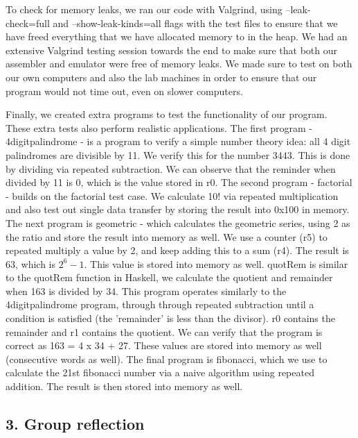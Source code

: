 \documentclass[a4paper]{article}
\begin{document}
To check for memory leaks, we ran our code with Valgrind, using --leak-check=full and --show-leak-kinds=all flags 
with the test files to ensure that we have freed everything that we have allocated memory to in the heap. We had an extensive Valgrind
testing session towards the end to make sure that both our assembler and emulator were free of memory leaks. We made sure to test on 
both our own computers and also the lab machines in order to ensure that our program would not time out, even on slower computers. 

Finally, we created extra programs to test the functionality of our program. These extra tests also perform realistic applications. The
first program - 4digitpalindrome - is a program to verify a simple number theory idea: all 4 digit palindromes are divisible by 11. We 
verify this for the number 3443. This is done by dividing via repeated subtraction. We can observe that the reminder when divided by 11 is 0,
which is the value stored in r0. The second program - factorial - builds on the factorial test case. We calculate 10! via repeated multiplication
and also test out single data transfer by storing the result into 0x100 in memory. The next program is geometric - which calculates the geometric 
series, using 2 as the ratio and store the result into memory as well. We use a counter (r5) to repeated multiply a value by 2, and keep adding 
this to a sum (r4). The result is 63, which is $2^{6}-1$. This value is stored into memory as well. quotRem is similar to the quotRem function in 
Haskell, we calculate the quotient and remainder when 163 is divided by 34. This program operates similarly to the 4digitpalindrome program, through 
through repeated subtraction until a condition is satisfied (the 'remainder' is less than the divisor). r0 contains the remainder and r1 contains the 
quotient. We can verify that the program is correct as 163 = 4 x 34 + 27. These values are stored into memory as well (consecutive words as well). 
The final program is fibonacci, which we use to calculate the 21st fibonacci number via a naive algorithm using repeated addition. The result is then 
stored into memory as well.

\bigskip
\bigskip

\subsection*{3. Group reflection}
\end{document}
